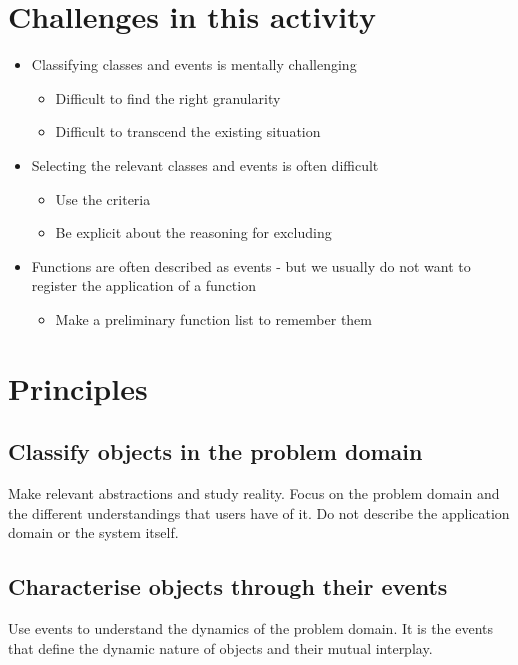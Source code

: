 \section{Challenges in this activity}
\begin{itemize}
    \item Classifying classes and events is mentally challenging %
    \begin{itemize}
        \item Difficult to find the right granularity
        \item Difficult to transcend the existing situation
    \end{itemize}
    \item Selecting the relevant classes and events is often difficult
    \begin{itemize}
        \item Use the criteria
        \item Be explicit about the reasoning for excluding
    \end{itemize}
    \item Functions are often described as events - but we usually do not want to register the application of a function
    \begin{itemize}
        \item Make a preliminary function list to remember them
    \end{itemize}
\end{itemize}

\section{Principles}
\subsection{Classify objects in the problem domain}
Make relevant abstractions and study reality. Focus on the problem domain and the different understandings that users have of it. Do not describe the application domain or the system itself.

\subsection{Characterise objects through their events}
Use events to understand the dynamics of the problem domain. It is the events that define the dynamic nature of objects and their mutual interplay.

